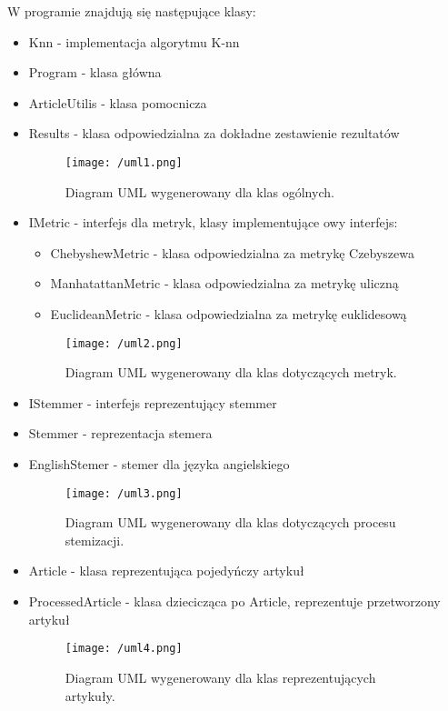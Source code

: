 \documentclass{classrep}
\begin{document}
W programie znajdują się następujące klasy:
\begin{itemize}[label=$\bullet$]
\item Knn - implementacja algorytmu K-nn
\item Program - klasa główna
\item ArticleUtilis - klasa pomocnicza
\item Results - klasa odpowiedzialna za dokładne zestawienie rezultatów

\begin{figure}[H]
	\centering
	\texttt{[image: /uml1.png]}
	\caption{Diagram UML wygenerowany dla klas ogólnych.}
\end{figure}

\item IMetric - interfejs dla metryk, klasy implementujące owy interfejs:
\begin{itemize}
\item ChebyshewMetric -  klasa odpowiedzialna za metrykę Czebyszewa
\item ManhatattanMetric -  klasa odpowiedzialna za metrykę uliczną
\item EuclideanMetric - klasa odpowiedzialna za metrykę euklidesową\\
\end{itemize}

\begin{figure}[H]
	\centering
	\texttt{[image: /uml2.png]}
	\caption{Diagram UML wygenerowany dla klas dotyczących metryk. }
\end{figure}

\item IStemmer - interfejs reprezentujący stemmer
\item Stemmer - reprezentacja stemera
\item EnglishStemer - stemer dla języka angielskiego

\begin{figure}[H]
	\centering
	\texttt{[image: /uml3.png]}
	\caption{Diagram UML wygenerowany dla klas dotyczących procesu stemizacji.}
\end{figure}

\item Article - klasa reprezentująca pojedyńczy artykuł
\item ProcessedArticle - klasa dziecicząca po Article, reprezentuje przetworzony artykuł


\begin{figure}[H]
	\centering
	\texttt{[image: /uml4.png]}
	\caption{Diagram UML wygenerowany dla klas reprezentujących artykuły.}
\end{figure}


\end{itemize}
\end{document}
